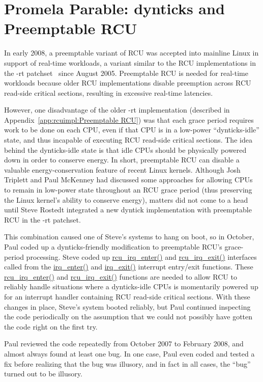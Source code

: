 
\section{Promela Parable: dynticks and Preemptable RCU}
\label{app:formal:Promela Parable: dynticks and Preemptable RCU}

In early 2008, a preemptable variant of RCU was accepted into
mainline Linux in support of real-time workloads,
a variant similar to the RCU implementations in
the -rt patchset~\cite{IngoMolnar05a}
since August 2005.
Preemptable RCU is needed for real-time workloads because older
RCU implementations disable preemption across RCU read-side
critical sections, resulting in excessive real-time latencies.

However, one disadvantage of the older -rt implementation
(described in Appendix~\ref{app:rcuimpl:Preemptable RCU})
was that each grace period
requires work to be done on each CPU, even if that CPU is in a low-power
``dynticks-idle'' state,
and thus incapable of executing RCU read-side critical sections.
The idea behind the dynticks-idle state is that idle CPUs
should be physically powered down in order to conserve energy.
In short, preemptable RCU can disable a valuable energy-conservation
feature of recent Linux kernels.
Although Josh Triplett and Paul McKenney
had discussed some approaches for allowing
CPUs to remain in low-power state throughout an RCU grace period
(thus preserving the Linux kernel's ability to conserve energy), matters
did not come to a head until Steve Rostedt integrated a new dyntick
implementation with preemptable RCU in the -rt patchset.

This combination caused one of Steve's systems to hang on boot, so in
October, Paul coded up a dynticks-friendly modification to preemptable RCU's
grace-period processing.
Steve coded up \url{rcu_irq_enter()} and \url{rcu_irq_exit()}
interfaces called from the
\url{irq_enter()} and \url{irq_exit()} interrupt
entry/exit functions.
These \url{rcu_irq_enter()} and \url{rcu_irq_exit()}
functions are needed to allow RCU to reliably handle situations where
a dynticks-idle CPUs is momentarily powered up for an interrupt
handler containing RCU read-side critical sections.
With these changes in place, Steve's system booted reliably,
but Paul continued inspecting the code periodically on the assumption
that we could not possibly have gotten the code right on the first try.

Paul reviewed the code repeatedly from October 2007 to February 2008,
and almost always found at least one bug.
In one case, Paul even coded and tested a fix before realizing that the
bug was illusory, and in fact in all cases, the ``bug'' turned out to be
illusory.

